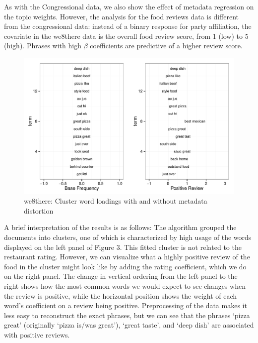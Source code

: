 \documentclass[12pt]{article}
\begin{document}
As with the Congressional data, we also show the effect of metadata regression on the topic weights. However, the analysis for the food reviews data is different from the congressional data: instead of a binary response for party affiliation, the covariate in the we8there data is the overall food review score, from 1 (low) to 5 (high). Phrases with high $\beta$ coefficients are predictive of a higher review score.

\begin{figure}[!htpb]
  \centering
\caption[Loadings]{we8there: Cluster word loadings with and without  metadata distortion}
  \includegraphics[width=6.2in]{Images/we8there_distortion.pdf}
\end{figure}

A brief interpretation of the results is as follows: The algorithm grouped the documents into clusters, one of which is characterized by high usage of the words displayed on the left panel of Figure 3. This fitted cluster is not related to the restaurant rating. However, we can visualize what a highly positive review of the food in the cluster might look like by adding the rating coefficient, which we do on the right panel. The change in vertical ordering from the left panel to the right shows how the most common words we would expect to see changes when the review is positive, while the horizontal position shows the weight of each word's coefficient on a review being positive. Preprocessing of the data makes it less easy to reconstruct the exact phrases, but we can see that the phrases `pizza great' (originally `pizza is/was great'), `great taste', and `deep dish' are associated with positive reviews. 
\end{document}
